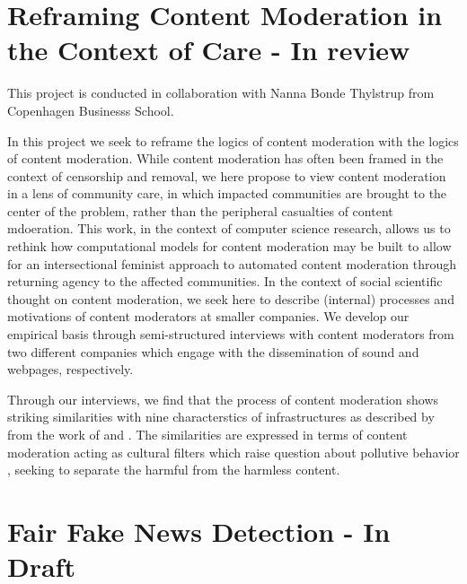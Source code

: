 
\section{Reframing Content Moderation in the Context of Care - In review}

This project is conducted in collaboration with Nanna Bonde Thylstrup from Copenhagen Businesss School.

In this project we seek to reframe the logics of content moderation with the logics of content moderation. While content moderation has often been framed in the context of censorship and removal, we here propose to view content moderation in a lens of community care, in which impacted communities are brought to the center of the problem, rather than the peripheral casualties of content mdoeration. This work, in the context of computer science research, allows us to rethink how computational models for content moderation may be built to allow for an intersectional feminist approach to automated content moderation through returning agency to the affected communities.
In the context of social scientific thought on content moderation, we seek here to describe (internal) processes and motivations of content moderators at smaller companies. We develop our empirical basis through semi-structured interviews with content moderators from two different companies which engage with the dissemination of sound and webpages, respectively.\vspace{5mm}

Through our interviews, we find that the process of content moderation shows striking similarities with nine characterstics of infrastructures as described by \cite{Graham-Thrift:2007} from the work of \cite{Star:1999} and \cite{Star-Ruhleder:1996}. The similarities are expressed in terms of content moderation acting as cultural filters which raise question about pollutive behavior \cite{Douglas:2015}, seeking to separate the harmful from the harmless content.

\section{Fair Fake News Detection - In Draft}

